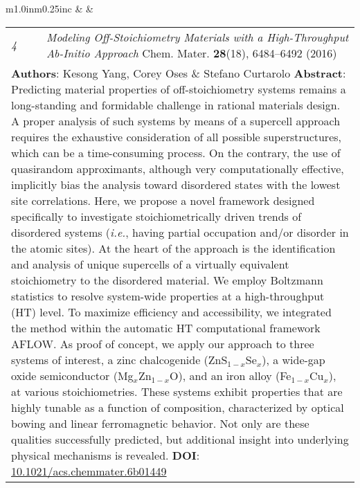 \documentclass[11pt]{article}
\begin{document}
\begin{tabular}{m{1.0in}m{0.25in}c}
 & & 
\begin{tabular}{m{0.3in}m{0.15in}m{4.3in}}
\textit{\small{4}} & & \textit{Modeling Off-Stoichiometry Materials with a High-Throughput Ab-Initio Approach} \newline Chem. Mater. \textbf{28}(18), 6484--6492 (2016)  \\ \multicolumn{3}{p{4.75in}}{\footnotesize{\textbf{Authors}: Kesong Yang, \textcolor{NavyBlue}{Corey Oses} \& Stefano Curtarolo \newline \textbf{Abstract}: Predicting material properties of off-stoichiometry systems remains a long-standing and formidable challenge in rational materials design. A proper analysis of such systems by means of a supercell approach requires the exhaustive consideration of all possible superstructures, which can be a time-consuming process. On the contrary, the use of quasirandom approximants, although very computationally effective, implicitly bias the analysis toward disordered states with the lowest site correlations. Here, we propose a novel framework designed specifically to investigate stoichiometrically driven trends of disordered systems (\textit{i.e.}, having partial occupation and/or disorder in the atomic sites). At the heart of the approach is the identification and analysis of unique supercells of a virtually equivalent stoichiometry to the disordered material. We employ Boltzmann statistics to resolve system-wide properties at a high-throughput (HT) level. To maximize efficiency and accessibility, we integrated the method within the automatic HT computational framework {\small AFLOW}. As proof of concept, we apply our approach to three systems of interest, a zinc chalcogenide (ZnS$_{1-x}$Se$_{x}$), a wide-gap oxide semiconductor (Mg$_{x}$Zn$_{1-x}$O), and an iron alloy (Fe$_{1-x}$Cu$_{x}$), at various stoichiometries. These systems exhibit properties that are highly tunable as a function of composition, characterized by optical bowing and linear ferromagnetic behavior. Not only are these qualities successfully predicted, but additional insight into underlying physical mechanisms is revealed. \newline \textbf{DOI}: \href{http://dx.doi.org/10.1021/acs.chemmater.6b01449}{10.1021/acs.chemmater.6b01449}}} 
\end{tabular} \\ 
\end{tabular}
\end{document}
